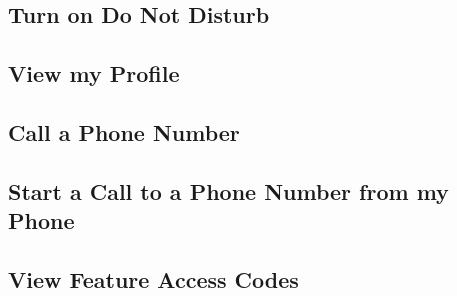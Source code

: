 \documentclass[12pt]{article}
\begin{document}
\subsection{Turn on Do Not Disturb}

\subsection{View my Profile}

\subsection{Call a Phone Number}

\subsection{Start a Call to a Phone Number from my Phone}

\subsection{View Feature Access Codes}
\end{document}
